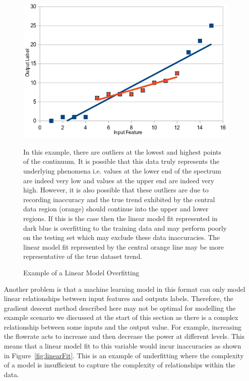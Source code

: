 \begin{figure}[h]
	\centering
	\includegraphics[scale=0.45]{Figures/overfitting.jpg}
	\caption{Example of a Linear Model Overfitting} {In this example, there are outliers at the lowest and highest points of the continuum.  It is possible that this data truly represents the underlying phenomena i.e. values at the lower end of the spectrum are indeed very low and values at the upper end are indeed very high. However, it is also possible that these outliers are due to recording inaccuracy and the true trend exhibited by the central data region (orange) should continue into the upper and lower regions. If this is the case then the linear model fit represented in dark blue is overfitting to the training data and may perform poorly on the testing set which may exclude these data inaccuracies. The linear model fit represented by the central orange line may be more representative of the true dataset trend.}
	\label{fig:overfitting}
\end{figure}
		
\noindent
Another problem is that a machine learning model in this format can only model linear relationships between input features and outputs labels. Therefore, the gradient descent method described here may not be optimal for modelling the example scenario we discussed at the start of this section as there is a complex relationship between some inputs and the output value. For example, increasing the flowrate acts to increase and then decrease the power at different levels. This means that a linear model fit to this variable would incur inaccuracies as shown in Figure~\ref{fig:linearFit}. This is an example of underfitting \cite{koehrsen2018overfitting} where the complexity of a model is insufficient to capture the complexity of relationships within the data. \\		

